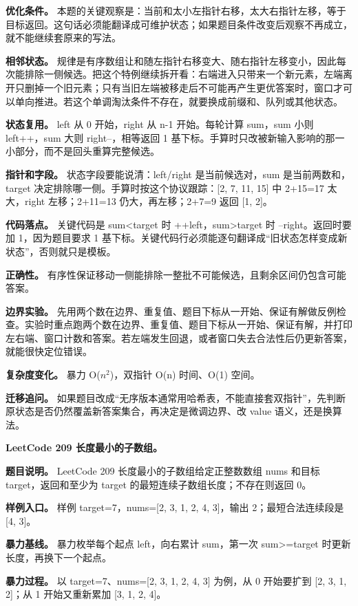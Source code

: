 \textbf{优化条件。} 本题的关键观察是：当前和太小左指针右移，太大右指针左移，等于目标返回。这句话必须能翻译成可维护状态；如果题目条件改变后观察不再成立，就不能继续套原来的写法。

\textbf{相邻状态。} 规律是有序数组让和随左指针右移变大、随右指针左移变小，因此每次能排除一侧候选。把这个特例继续拆开看：右端进入只带来一个新元素，左端离开只删掉一个旧元素；只有当旧左端被移走后不可能再产生更优答案时，窗口才可以单向推进。若这个单调淘汰条件不存在，就要换成前缀和、队列或其他状态。

\textbf{状态复用。} left 从 0 开始，right 从 n-1 开始。每轮计算 sum，sum 小则 left++，sum 大则 right--，相等返回 1 基下标。手算时只改被新输入影响的那一小部分，而不是回头重算完整候选。

\textbf{指针和字段。} 状态字段要能说清：left/right 是当前候选对，sum 是当前两数和，target 决定排除哪一侧。手算时按这个协议跟踪：[2, 7, 11, 15] 中 2+15=17 太大，right 左移；2+11=13 仍大，再左移；2+7=9 返回 [1, 2]。

\textbf{代码落点。} 关键代码是 sum<target 时 ++left，sum>target 时 --right。返回时要加 1，因为题目要求 1 基下标。关键代码行必须能逐句翻译成“旧状态怎样变成新状态”，否则就只是模板。

\textbf{正确性。} 有序性保证移动一侧能排除一整批不可能候选，且剩余区间仍包含可能答案。

\textbf{边界实验。} 先用两个数在边界、重复值、题目下标从一开始、保证有解做反例检查。实验时重点跑两个数在边界、重复值、题目下标从一开始、保证有解，并打印左右端、窗口计数和答案。若左端发生回退，或者窗口失去合法性后仍更新答案，就能很快定位错误。

\textbf{复杂度变化。} 暴力 O(\ensuremath{n^{2}})，双指针 O(n) 时间、O(1) 空间。

\textbf{迁移追问。} 如果题目改成“无序版本通常用哈希表，不能直接套双指针”，先判断原状态是否仍然覆盖新答案集合，再决定是微调边界、改 value 语义，还是换算法。

\noindent\textbf{LeetCode 209 长度最小的子数组。}

\textbf{题目说明。} LeetCode 209 长度最小的子数组给定正整数数组 nums 和目标 target，返回和至少为 target 的最短连续子数组长度；不存在则返回 0。

\textbf{样例入口。} 样例 target=7，nums=[2, 3, 1, 2, 4, 3]，输出 2；最短合法连续段是 [4, 3]。

\textbf{暴力基线。} 暴力枚举每个起点 left，向右累计 sum，第一次 sum>=target 时更新长度，再换下一个起点。

\textbf{暴力过程。} 以 target=7、nums=[2, 3, 1, 2, 4, 3] 为例，从 0 开始要扩到 [2, 3, 1, 2]；从 1 开始又重新累加 [3, 1, 2, 4]。


